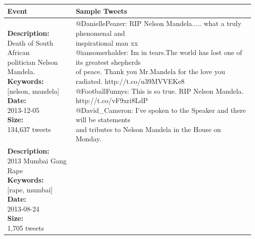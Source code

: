\begin{table}[!htb]
  \centering
  {\scriptsize
    \begin{tabular*}{1\linewidth}{p{5cm}p{5cm}}
      \toprule
      \textbf{Event} & \textbf{Sample Tweets} \\
      \midrule
      \pbox{20cm}{\textbf{Description:}\\ Death of South African\\ politician Nelson Mandela. \vspace{.1cm}\\
        \textbf{Keywords:}\\ {[}nelson, mandela{]}\vspace{.1cm}\\
        \textbf{Date:}\\ 2013-12-05 \vspace{.1cm}\\
        \textbf{Size:} \\ 134,637 tweets}
      & \pbox{20cm}{
        @DaniellePeazer: RIP Nelson Mandela..... what a truly phenomenal and\\ inspirational man xx\vspace{.1cm}\\
        @iansomerhalder: Im in tears.The world has lost one of its greatest shepherds \\of peace. Thank you Mr.Mandela for the love you radiated. http://t.co/u39MVVEKe8\vspace{.1cm}\\
        @FootballFunnys: This is so true. RIP Nelson Mandela. http://t.co/vF9xri8LdP\vspace{.1cm}\\
        @David\_Cameron: I've spoken to the Speaker and there will be statements \\and tributes to Nelson Mandela in the House on Monday.} \\
      \midrule
      \pbox{20cm}{\textbf{Description:}\\ 2013 Mumbai Gang Rape \vspace{.1cm}\\
        \textbf{Keywords:}\\ {[}rape, mumbai{]}\vspace{.1cm}\\
        \textbf{Date:}\\ 2013-08-24 \vspace{.1cm}\\
        \textbf{Size:} \\1,705 tweets}

\end{tabular*}}
\end{table}
